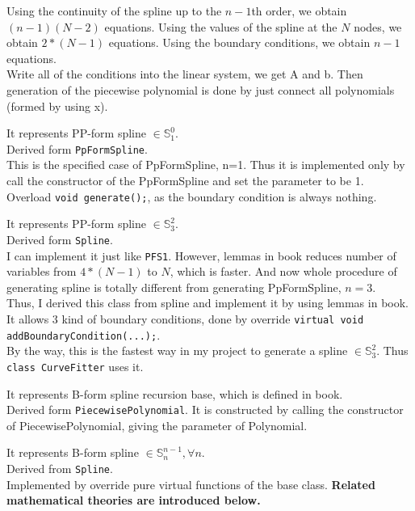 \documentclass[a4paper]{article}
\begin{document}
\begin{description}
  Using the continuity of the spline up to the \(n-1\)th order, we obtain \((n-1)(N-2)\) equations.  
  Using the values of the spline at the \(N\) nodes, we obtain \(2*(N-1)\) equations.  
  Using the boundary conditions, we obtain \(n-1\) equations.\\
  Write all of the conditions into the linear system, we get A and b. 
  Then generation of the piecewise polynomial is done by just connect all polynomials (formed by using x).
  \item[PFS1]
  It represents PP-form spline $\in \mathbb{S}_1^0$.\\ 
  Derived form \texttt{PpFormSpline}.\\
  This is the specified case of PpFormSpline, n=1. Thus it is implemented only by call the constructor of the PpFormSpline and set the parameter to be 1.\\
  Overload \texttt{void generate();}, as the boundary condition is always nothing.
  \item[PFS3]
  It represents PP-form spline $\in \mathbb{S}_3^2$.\\ 
  Derived form \texttt{Spline}.\\
  I can implement it just like \texttt{PFS1}. 
  However, lemmas\cite*{Lemmas_constructing_pp-form_splines} in book reduces number of variables from \(4*(N-1)\) to \(N\), 
  which is faster. 
  And now whole procedure of generating spline is totally different from generating PpFormSpline, $n=3$. \\
  Thus, I derived this class from spline and implement it by using lemmas in book.\\
  It allows 3 kind of boundary conditions, done by override \texttt{virtual void addBoundaryCondition(...);}.\\
  By the way, this is the fastest way in my project to generate a spline $\in \mathbb{S}_3^2$. Thus \texttt{class CurveFitter} uses it.
  \item[BFSRB]
  It represents B-form spline recursion base, which is defined in book\cite*{Defn_3_23}. \\
  Derived form \texttt{PiecewisePolynomial}. It is constructed by calling the constructor of PiecewisePolynomial, giving the parameter of Polynomial.\\
  \item[BFormSpline]
  It represents B-form spline $\in \mathbb{S}_n^{n-1}, \forall n$.\\
  Derived from \texttt{Spline}.\\
  Implemented by override pure virtual functions of the base class. \textbf{Related mathematical theories are introduced below.}\\

\end{description}
\end{document}

